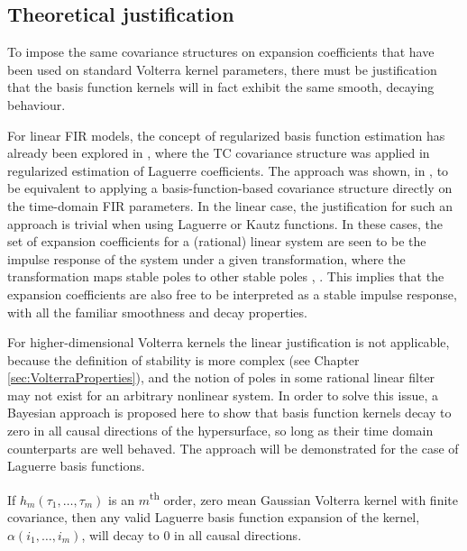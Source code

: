 \subsection{Theoretical justification}

To impose the same covariance structures on expansion coefficients that have been used on standard Volterra kernel parameters, there must be justification that the basis function kernels will in fact exhibit the same smooth, decaying behaviour. 

For linear FIR models, the concept of regularized basis function estimation has already been explored in \cite{Chen2015}, where the TC covariance structure was applied in regularized estimation of Laguerre coefficients. The approach was shown, in \cite{Darwish2018}, to be equivalent to applying a basis-function-based covariance structure directly on the time-domain FIR parameters. In the linear case, the justification for such an approach is trivial when using Laguerre or Kautz functions. In these cases, the set of expansion coefficients for a (rational) linear system are seen to be the impulse response of the system under a given transformation, where the transformation maps stable poles to other stable poles \cite{Heuberger2005}, \cite{Wahlberg1994}. This implies that the expansion coefficients are also free to be interpreted as a stable impulse response, with all the familiar smoothness and decay properties.   

For higher-dimensional Volterra kernels the linear justification is not applicable, because the definition of stability is more complex (see Chapter \ref{sec:VolterraProperties}), and the notion of poles in some rational linear filter may not exist for an arbitrary nonlinear system. In order to solve this issue, a Bayesian approach is proposed here to show that basis function kernels decay to zero in all causal directions of the hypersurface, so long as their time domain counterparts are well behaved. The approach will be demonstrated for the case of Laguerre basis functions.

\begin{thm}
\label{thm:DecayingLBFs}
If $h_m(\tau_1, \hdots, \tau_m)$ is an $m$\textsuperscript{th} order, zero mean Gaussian Volterra kernel with finite covariance, then any valid Laguerre basis function expansion of the kernel, $\alpha(i_1, \hdots, i_m)$, will decay to 0 in all causal directions.
\end{thm}

